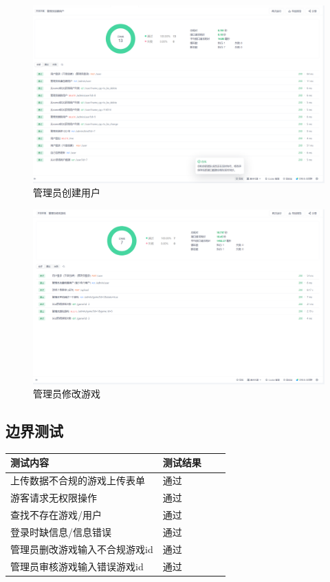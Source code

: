 \documentclass[12pt]{ctexart} %
\begin{document}
\begin{figure}[H]
  \centering
  \includegraphics[width=\textwidth]{testresult2.png}
  \caption{管理员创建用户}
\end{figure}

\begin{figure}[H]
  \centering
  \includegraphics[width=\textwidth]{testresult3.png}
  \caption{管理员修改游戏}
\end{figure}

\subsection{边界测试}
\begin{table}[H]
\centering
\large
\renewcommand{\arraystretch}{1.5} 
\begin{tabular}{|>{\centering\arraybackslash}p{12cm}|>{\centering\arraybackslash}p{3cm}|>{\centering\arraybackslash}p{5cm}|>{\raggedright\arraybackslash}p{4cm}|}
\hline
\textbf{测试内容} & \textbf{测试结果} \\
\hline
 上传数据不合规的游戏上传表单 & 通过 \\
\hline
 游客请求无权限操作 & 通过 \\
\hline
 查找不存在游戏/用户 & 通过 \\
\hline
 登录时缺信息/信息错误 & 通过 \\
\hline
 管理员删改游戏输入不合规游戏id & 通过 \\
\hline
 管理员审核游戏输入错误游戏id & 通过 \\
\hline
\end{tabular}
\end{table}
\end{document}
